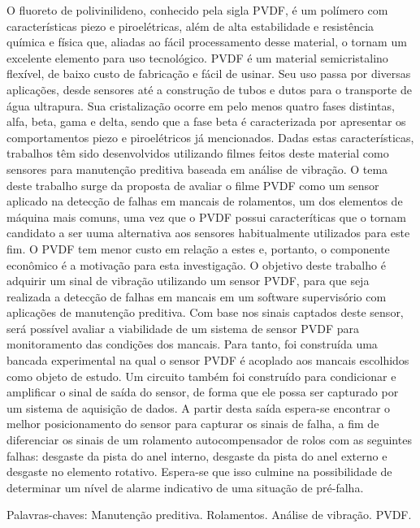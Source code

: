 \documentclass[
	12pt,				
	oneside,			
	a4paper,			
	english,			
	brazil,			
	]{abntex2ppgsi}
\begin{document}
\begin{resumo}
O fluoreto de polivinilideno, conhecido pela sigla PVDF, é um polímero com características piezo e piroelétricas, além de alta estabilidade e resistência química e física que, aliadas ao fácil processamento desse material, o tornam um excelente elemento para uso tecnológico. PVDF é um material semicristalino flexível, de baixo custo de fabricação e fácil de usinar. Seu uso passa por diversas aplicações, desde sensores até a construção de tubos e dutos para o transporte de água ultrapura. Sua cristalização ocorre em pelo menos quatro fases distintas, alfa, beta, gama e delta, sendo que a fase beta é caracterizada por apresentar os comportamentos piezo e piroelétricos já mencionados.
Dadas estas características, trabalhos têm sido desenvolvidos utilizando filmes feitos deste material como sensores para manutenção preditiva baseada em análise de vibração. O tema deste trabalho surge da proposta de avaliar o filme PVDF como um sensor aplicado na detecção de falhas em mancais de rolamentos, um dos elementos de máquina mais comuns, uma vez que o PVDF possui caracteríticas que o tornam candidato a ser uuma alternativa aos sensores habitualmente utilizados para este fim. O PVDF tem menor custo em relação a estes e, portanto, o componente econômico é a motivação para esta investigação.
O objetivo deste trabalho é adquirir um sinal de vibração utilizando um sensor PVDF, para que seja realizada a detecção de falhas em mancais em um software supervisório com aplicações de manutenção preditiva. Com base nos sinais captados deste sensor, será possível avaliar a viabilidade de um sistema de sensor PVDF para monitoramento das condições dos mancais. Para tanto, foi construída uma bancada experimental na qual o sensor PVDF é acoplado aos mancais escolhidos como objeto de estudo. Um circuito também foi construído para condicionar e amplificar o sinal de saída do sensor, de forma que ele possa ser capturado por um sistema de aquisição de dados. A partir desta saída espera-se encontrar o melhor posicionamento do sensor para capturar os sinais de falha, a fim de diferenciar os sinais de um rolamento autocompensador de rolos com as seguintes falhas: desgaste da pista do anel interno, desgaste da pista do anel externo e desgaste no elemento rotativo. Espera-se que isso culmine na possibilidade de determinar um nível de alarme indicativo de uma situação de pré-falha.


Palavras-chaves: Manutenção preditiva. Rolamentos. Análise de vibração. PVDF.
\end{resumo}

\end{document}

